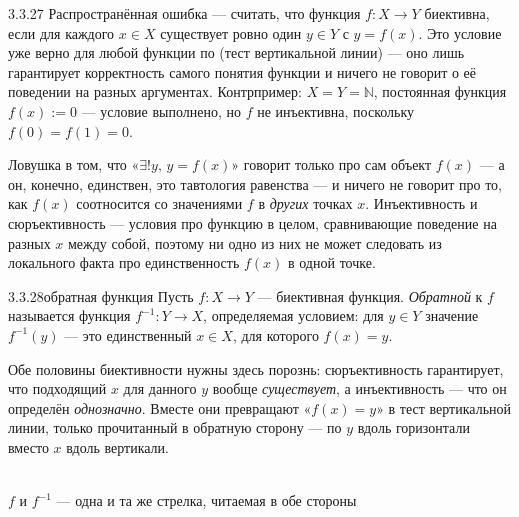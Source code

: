 \begin{remarknum}{3.3.27}{}
Распространённая ошибка — считать, что функция $f:X\to Y$ биективна, если для каждого
$x\in X$ существует ровно один $y\in Y$ с $y=f(x)$. Это условие уже верно для любой функции
по  (тест вертикальной линии) — оно лишь гарантирует
корректность самого понятия функции и ничего не говорит о её поведении на разных аргументах.
Контрпример: $X=Y=\mathbb{N}$, постоянная функция $f(x):=0$ — условие выполнено, но $f$ не
инъективна, поскольку $f(0)=f(1)=0$.
\end{remarknum}

\begin{intuition}
Ловушка в том, что «$\exists! y,\, y=f(x)$» говорит только про сам объект $f(x)$ — а он,
конечно, единствен, это тавтология равенства — и ничего не говорит про то, как $f(x)$
соотносится со значениями $f$ в \emph{других} точках $x$. Инъективность и сюръективность —
условия про функцию в целом, сравнивающие поведение на разных $x$ между собой, поэтому ни
одно из них не может следовать из локального факта про единственность $f(x)$ в одной точке.
\end{intuition}

\begin{definition}{3.3.28}{обратная функция}
Пусть $f:X\to Y$ — биективная функция. \emph{Обратной} к $f$ называется функция
$f^{-1}:Y\to X$, определяемая условием: для $y\in Y$ значение $f^{-1}(y)$ — это единственный
$x\in X$, для которого $f(x)=y$.
\end{definition}

\begin{intuition}
Обе половины биективности нужны здесь порознь: сюръективность гарантирует, что подходящий
$x$ для данного $y$ вообще \emph{существует}, а инъективность — что он определён
\emph{однозначно}. Вместе они превращают «$f(x)=y$» в тест вертикальной линии, только
прочитанный в обратную сторону — по $y$ вдоль горизонтали вместо $x$ вдоль вертикали.

\begin{center}
\\
{\footnotesize\color{intuitiongray}$f$ и $f^{-1}$ — одна и та же стрелка, читаемая в обе
стороны}
\end{center}
\end{intuition}

